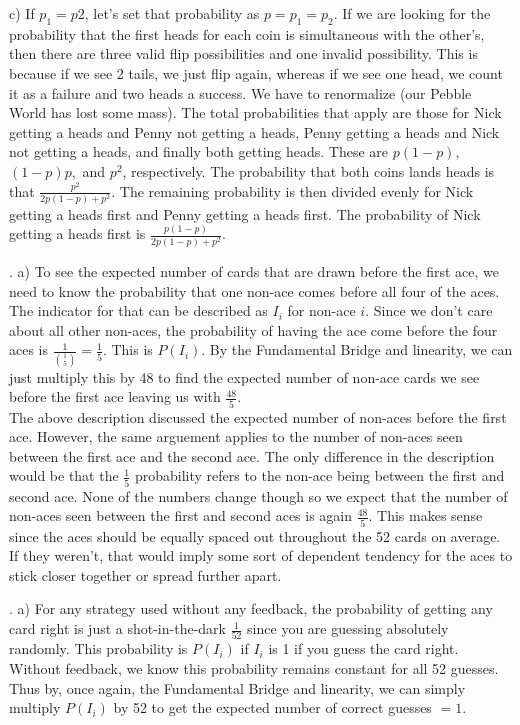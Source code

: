 \documentclass[11pt]{article}
\begin{document}
    c) If $p_1=p2$, let's set that probability as $p=p_1=p_2$. If we are looking for the probability that the first heads for each coin is simultaneous with the other's, then there are three valid flip possibilities and one invalid possibility.  This is because if we see 2 tails, we just flip again, whereas if we see one head, we count it as a failure and two heads a success.  We have to renormalize (our Pebble World has lost some mass).  The total probabilities that apply are those for Nick getting a heads and Penny not getting a heads, Penny getting a heads and Nick not getting a heads, and finally both getting heads.  These are $p(1-p),$ $(1-p)p,$ and $p^2$, respectively. The probability that both coins lands heads is that $\boxed{\frac{p^2}{2p(1-p)+p^2}}$.
    The remaining probability is then divided evenly for Nick getting a heads first and Penny getting a heads first.  The probability of Nick getting a heads first is $\boxed{\frac{p(1-p)}{2p(1-p)+p^2}}$.\\
\bigskip

.
\smallskip	
	a) To see the expected number of cards that are drawn before the first ace, we need to know the probability that one non-ace comes before all four of the aces.  The indicator for that can be described as $I_i$ for non-ace $i$. Since we don't care about all other non-aces, the probability of having the ace come before the four aces is $\frac{1}{\binom{1}{5}}=\frac{1}{5}$.  This is $P(I_i)$.  By the Fundamental Bridge and linearity, we can just multiply this by 48 to find the expected number of non-ace cards we see before the first ace leaving us with $\boxed{\frac{48}{5}}$.  \\

    The above description discussed the expected number of non-aces before the first ace.  However, the same arguement applies to the number of non-aces seen between the first ace and the second ace.  The only difference in the description would be that the $\frac{1}{5}$ probability refers to the non-ace being between the first and second ace.  None of the numbers change though so we expect that the number of non-aces seen between the first and second aces is again $\boxed{\frac{48}{5}}$. This makes sense since the aces should be equally spaced out throughout the 52 cards on average.  If they weren't, that would imply some sort of dependent tendency for the aces to stick closer together or spread further apart.  
    

\bigskip

.
\smallskip
    a) For any strategy used without any feedback, the probability of getting any card right is just a shot-in-the-dark $\frac{1}{52}$ since you are guessing absolutely randomly. This probability is $P(I_i)$ if $I_i$ is 1 if you guess the card right.  Without feedback, we know this probability remains constant for all 52 guesses.  Thus by, once again, the Fundamental Bridge and linearity, we can simply multiply $P(I_i)$ by 52 to get the expected number of correct guesses $=\boxed{1}$.\\
\end{document}
